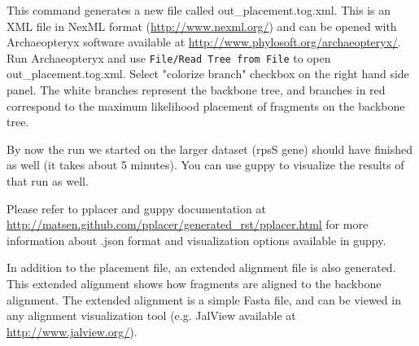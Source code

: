 \documentclass[11pt]{article} %
\newcommand{\ins}[1]{{\tt #1}}
\newcommand{\file}[1]{{\sf #1}}
\newcommand{\pplacer}{pplacer\xspace}
\newcommand{\guppy}{guppy\xspace}
\newcommand{\arch}{Archaeopteryx\xspace}
\begin{document}
This command generates a new file called \file{out\_placement.tog.xml}. This is an XML file in NexML format (\url{http://www.nexml.org/}) and can be opened with \arch software {available at \url{http://www.phylosoft.org/archaeopteryx/}}. 
Run \arch and use \ins{File/Read Tree from File} to open \file{out\_placement.tog.xml}. Select "colorize branch" checkbox on the right hand side panel. The white branches represent the backbone tree, and branches in red correspond to the maximum likelihood placement of fragments on the backbone tree. 

By now the run we started on the larger dataset (rpsS gene) should have finished as well (it takes about 5 minutes). You can use \guppy to visualize the results of that run as well. 

Please refer to \pplacer and \guppy documentation at \url{http://matsen.github.com/pplacer/generated_rst/pplacer.html} for more information about \file{.json} format and visualization options available in \guppy. 

In addition to the placement file, an extended alignment file is also generated. This extended alignment shows how fragments are aligned to the backbone alignment. The extended alignment is a simple Fasta file, and can be viewed in any alignment visualization tool (e.g. JalView available at \url{http://www.jalview.org/}). 

\end{document}
